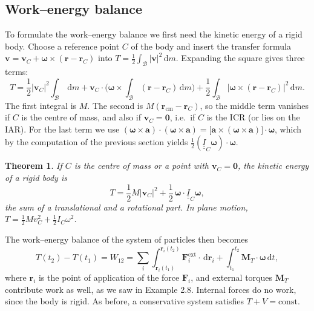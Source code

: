 \documentclass[11pt,a4paper,oneside]{report}
\numberwithin{equation}{chapter}
\newcommand{\vect}[1]{\bm{#1}}
\newcommand{\tens}[1]{\underline{\underline{#1}}}
\newcommand{\dd}{\,\mathrm{d}}
\newcommand{\cm}{\mathrm{cm}}
\newcommand{\ext}{\mathrm{ext}}
\theoremstyle{plain}
\newtheorem{theorem}{Theorem}[chapter]
\theoremstyle{definition}
\theoremstyle{remark}
\newcommand{\lecture}[2]{\marginpar{\raggedright\footnotesize\textsc{Lecture #1}\\\textit{#2}}}
\begin{document}
\subsection{Work--energy balance}
\lecture{13}{28.10.2026}
To formulate the work--energy balance we first need the kinetic energy of a rigid body. Choose a reference point $C$ of
the body and insert the transfer formula $\vect v=\vect v_C+\vect\omega\times(\vect r-\vect r_C)$ into
$T=\frac12\int_{\mathcal B}|\vect v|^2\dd m$. Expanding the square gives three terms:
\[
  T=\frac12|\vect v_C|^2\int_{\mathcal B}\dd m+\vect v_C\cdot\Big(\vect\omega\times\int_{\mathcal B}(\vect r-\vect r_C)\dd m\Big)
  +\frac12\int_{\mathcal B}\big|\vect\omega\times(\vect r-\vect r_C)\big|^2\dd m .
\]
The first integral is $M$. The second is $M(\vect r_\cm-\vect r_C)$, so the middle term vanishes if $C$ is the centre of
mass, and also if $\vect v_C=\vect 0$, i.e.\ if $C$ is the ICR (or lies on the IAR). For the last term we use
$(\vect\omega\times\vect a)\cdot(\vect\omega\times\vect a)=\big[\vect a\times(\vect\omega\times\vect a)\big]\cdot\vect\omega$,
which by the computation of the previous section yields $\frac12(\tens I_C\vect\omega)\cdot\vect\omega$.

\begin{theorem}
If $C$ is the centre of mass or a point with $\vect v_C=\vect 0$, the kinetic energy of a rigid body is
\begin{equation}
  T=\frac12M|\vect v_C|^2+\frac12\,\vect\omega\cdot\tens I_C\vect\omega ,
\end{equation}
the sum of a translational and a rotational part. In plane motion, $T=\frac12Mv_C^2+\frac12I_C\omega^2$.
\end{theorem}

The work--energy balance of the system of particles then becomes
\begin{equation}
  T(t_2)-T(t_1)=W_{12}=\sum_i\int_{\vect r_i(t_1)}^{\vect r_i(t_2)}\vect F_i^{\ext}\cdot\dd\vect r_i+\int_{t_1}^{t_2}\vect M_T\cdot\vect\omega\dd t ,
\end{equation}
where $\vect r_i$ is the point of application of the force $\vect F_i$, and external torques $\vect M_T$ contribute
work as well, as we saw in Example 2.8. Internal forces do no work, since the body is rigid. As before, a conservative
system satisfies $T+V=\text{const}$.
\end{document}
